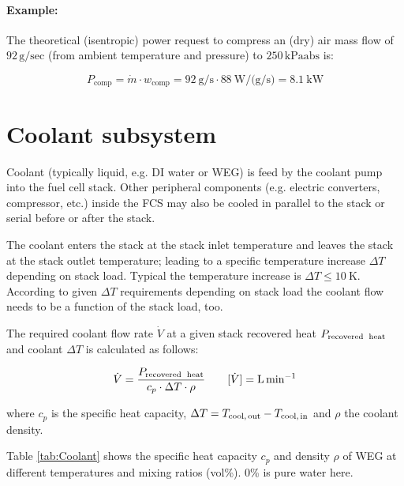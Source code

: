 \documentclass[11pt,a4paper,english,twoside]{scrreprt}
\begin{document}
\paragraph {Example:} The theoretical (isentropic) power request to compress an (dry) air mass flow of $92\,\mathrm{g/sec}$ (from ambient temperature and pressure) to $250\,\mathrm{kPaabs}$ is:

\[
	P_\text{comp} = \dot{m} \cdot w_\text{comp} = \SI{92}{\gram\per\second} \cdot \SI{88}{\watt\per(\gram\per\second)} = \SI{8.1}{\kilo\watt}
\]


\section{Coolant subsystem}

Coolant (typically liquid, e.g. DI water or WEG) is feed by the coolant pump into the fuel cell stack. Other peripheral components (e.g. electric converters, compressor, etc.) inside the FCS may also be cooled in parallel to the stack or serial before or after the stack.

The coolant enters the stack at the stack inlet temperature and leaves the stack at the stack outlet temperature; leading to a specific temperature increase $\Delta T$ depending on stack load. Typical the temperature increase is $\Delta T\le \SI{10}{\kelvin}$. According to given $\Delta T$ requirements depending on stack load the coolant flow needs to be a function of the stack load, too.

The required coolant flow rate $\dot{V}$ at a given stack recovered heat $P_\text{recovered\; heat}$ and coolant $\Delta T$ is calculated as follows:

\[\dot{V}=\frac{P_\text{recovered\; heat}}{c_{p} \cdot \Delta T\cdot \rho } \quad \quad [\dot{V}]=\si{\liter\per\minute}\]

where $c_p$ is the specific heat capacity, $\Delta T=T_\text{cool,\,out} -T_\text{cool,\,in}$ and $\rho$ the coolant density.

Table \ref{tab:Coolant} shows the specific heat capacity $c_p$ and density $\rho$ of WEG at different temperatures and mixing ratios (vol\%). 0\% is pure water here.
\end{document}
